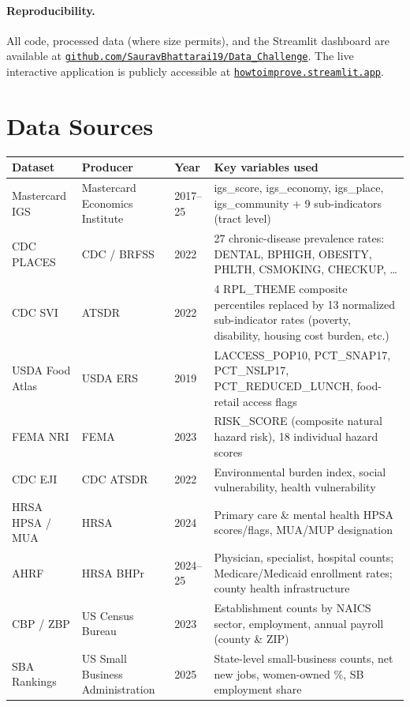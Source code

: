 \documentclass[10pt, letterpaper]{article}
\begin{document}
\paragraph{Reproducibility.}  All code, processed data (where size
permits), and the Streamlit dashboard are available at
\href{https://github.com/SauravBhattarai19/Data_Challenge}%
{\texttt{github.com/SauravBhattarai19/Data\_Challenge}}.
The live interactive application is publicly accessible at
\href{https://howtoimprove.streamlit.app}{\texttt{howtoimprove.streamlit.app}}.

\section*{Data Sources}

\small
\begin{tabular}{@{}p{2.6cm}p{2.8cm}p{1.0cm}p{6.5cm}@{}}
\toprule
\textbf{Dataset} & \textbf{Producer} & \textbf{Year} & \textbf{Key variables used} \\
\midrule
Mastercard IGS &
  Mastercard Economics Institute &
  2017–25 &
  igs\_score, igs\_economy, igs\_place, igs\_community + 9 sub-indicators (tract level) \\[4pt]
CDC PLACES &
  CDC / BRFSS &
  2022 &
  27 chronic-disease prevalence rates: DENTAL, BPHIGH, OBESITY, PHLTH, CSMOKING, CHECKUP, \ldots \\[4pt]
CDC SVI &
  ATSDR &
  2022 &
  4 RPL\_THEME composite percentiles replaced by 13 normalized sub-indicator rates (poverty, disability, housing cost burden, etc.) \\[4pt]
USDA Food Atlas &
  USDA ERS &
  2019 &
  LACCESS\_POP10, PCT\_SNAP17, PCT\_NSLP17, PCT\_REDUCED\_LUNCH, food-retail access flags \\[4pt]
FEMA NRI &
  FEMA &
  2023 &
  RISK\_SCORE (composite natural hazard risk), 18 individual hazard scores \\[4pt]
CDC EJI &
  CDC ATSDR &
  2022 &
  Environmental burden index, social vulnerability, health vulnerability \\[4pt]
HRSA HPSA / MUA &
  HRSA &
  2024 &
  Primary care \& mental health HPSA scores/flags, MUA/MUP designation \\[4pt]
AHRF &
  HRSA BHPr &
  2024–25 &
  Physician, specialist, hospital counts; Medicare/Medicaid enrollment rates; county health infrastructure \\[4pt]
CBP / ZBP &
  US Census Bureau &
  2023 &
  Establishment counts by NAICS sector, employment, annual payroll (county \& ZIP) \\[4pt]
SBA Rankings &
  US Small Business Administration &
  2025 &
  State-level small-business counts, net new jobs, women-owned \%, SB employment share \\
\bottomrule
\end{tabular}
\normalsize
\end{document}
